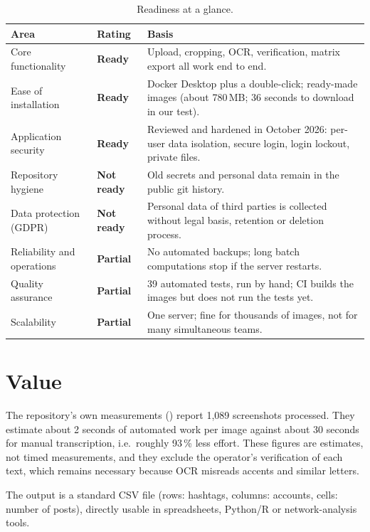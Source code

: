 \documentclass[10pt,a4paper]{scrartcl}
\renewcommand{\emph}[1]{\textcolor{accent}{#1}}
\newcommand{\RuleSection}[1]{%
    \section{#1}%
    \vspace{0.2em}{\color{accent!35}\hrule height 0.4pt}\vspace{0.3em}%
  }
\DeclareRobustCommand{\code}[1]{{\frenchspacing\texttt{\detokenize{#1}}}}
\newcommand{\ready}{\textcolor{accent}{\textbf{Ready}}}
\newcommand{\partly}{\textcolor{Dandelion!80!black}{\textbf{Partial}}}
\newcommand{\notready}{\textcolor{BrickRed}{\textbf{Not ready}}}
\begin{document}
  \begin{table}[h]
  \small
  \centering
  \renewcommand{\arraystretch}{1.1}
  \begin{tabularx}{\textwidth}{@{}L{4.4cm} L{2cm} X@{}}
  \toprule
  \textbf{Area} & \textbf{Rating} & \textbf{Basis} \\[.3cm]
  \midrule
  Core functionality & \ready & Upload, cropping, OCR, verification, matrix export all work end to end. \\[.3cm]
  Ease of installation & \ready & Docker Desktop plus a double-click; ready-made images (about 780\,MB; 36 seconds to download in our test). \\[.3cm]
  Application security & \ready & Reviewed and hardened in October 2026: per-user data isolation, secure login, login lockout, private files. \\[.3cm]
  Repository hygiene & \notready & Old secrets and personal data remain in the public git history. \\[.3cm]
  Data protection (GDPR) & \notready & Personal data of third parties is collected without legal basis, retention or deletion process. \\[.3cm]
  Reliability and operations & \partly & No automated backups; long batch computations stop if the server restarts. \\[.3cm]
  Quality assurance & \partly & 39 automated tests, run by hand; CI builds the images but does not run the tests yet. \\[.3cm]
  Scalability & \partly & One server; fine for thousands of images, not for many simultaneous teams. \\[.3cm]
  \bottomrule
  \end{tabularx}
  \caption{Readiness at a glance.}
  \label{tab:readiness}
  \end{table}

  \RuleSection{Value}
  \label{sec:value}

  The repository's own measurements (\code{stats.md}) report 1{,}089 screenshots processed. They estimate about
  2 seconds of automated work per image against about 30 seconds for manual transcription, i.e.\ roughly 93\,\%
  less effort. These figures are \emph{estimates}, not timed measurements, and they exclude the operator's
  verification of each text, which remains necessary because OCR misreads accents and similar letters.

  The output is a standard CSV file (rows: hashtags, columns: accounts, cells: number of posts), directly usable in
  spreadsheets, Python/R or network-analysis tools.
\end{document}
